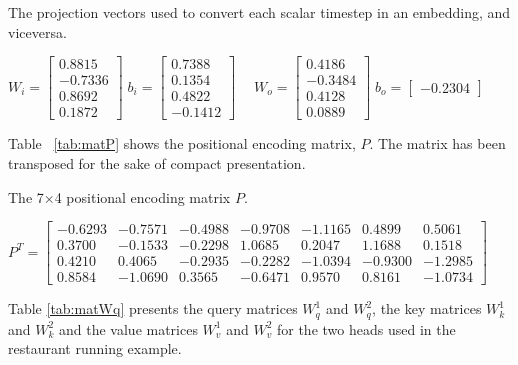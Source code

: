 \documentclass[algorithms,article,submit,pdftex,moreauthors]{Definitions/mdpi}
\begin{document}
\begin{table}[ht]
	\centering
	\caption{The projection vectors used to convert each scalar timestep in an embedding, and viceversa.}
	\label{tab:seca}
	$
	W_i = 	\begin{bmatrix}
				0.8815 \\
				-0.7336 \\
				0.8692 \\
				0.1872
			\end{bmatrix} \;
	b_i = 	\begin{bmatrix}
				0.7388 \\ 0.1354 \\ 0.4822 \\ -0.1412
			\end{bmatrix} \quad\;
	W_o = 	\begin{bmatrix}
				0.4186 \\ -0.3484 \\ 0.4128 \\ 0.0889
			\end{bmatrix} \;
	b_o = 	\begin{bmatrix}
				-0.2304
			\end{bmatrix}
	$
\end{table}

\noindent Table ~\ref{tab:matP} shows the positional encoding matrix, $P$. The matrix has been transposed for the sake of compact presentation.

\begin{table}[ht]
	\centering
	\caption{The 7$\times$4 positional encoding matrix $P$.}
	\label{tab:matP}
	$
	P^T = \begin{bmatrix}
 	   -0.6293 & -0.7571 & -0.4988 & -0.9708 & -1.1165 &  0.4899 &  0.5061 \\
		0.3700 & -0.1533 & -0.2298 &  1.0685 &  0.2047 &  1.1688 &  0.1518 \\
		0.4210 &  0.4065 & -0.2935 & -0.2282 & -1.0394 & -0.9300 & -1.2985 \\
		0.8584 & -1.0690 &  0.3565 & -0.6471 &  0.9570 &  0.8161 & -1.0734
	\end{bmatrix}
	$
\end{table}

\noindent Table \ref{tab:matWq} presents the query matrices $W^1_q$ and $W^2_q$, the key matrices $W^1_k$ and $W^2_k$ and the value matrices $W^1_v$ and $W^2_v$ for the two heads used in the restaurant running example.
\end{document}
